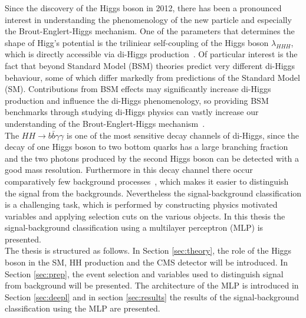 \label{sec:introduction}

Since the discovery of the Higgs boson in 2012, there has been a pronounced interest in understanding the
phenomenology of the new particle and especially the Brout-Englert-Higgs mechanism. One of the parameters
that determines the shape of Higg's potential is the triliniear self-coupling of the Higgs boson $\lambda_{HHH}$,
which is directly accessible via di-Higgs production~\cite{CMS:2021qbp, HandbookLHC}. Of particular interest is the fact that beyond Standard Model (BSM) theories
predict very different di-Higgs behaviour, some of which differ markedly from predictions of the Standard Model (SM).
Contributions from BSM effects may significantly increase di-Higgs production and influence the di-Higgs phenomenology, so providing BSM benchmarks
through studying di-Higgs physics can vastly increase our understanding of the Brout-Englert-Higgs mechanism~\cite{HandbookLHC}. \\

The $HH \rightarrow b \bar{b} \gamma \gamma$ is one of the most sensitive decay channels of di-Higgs, since the decay of one Higgs boson
to two bottom quarks has a large branching fraction and the two photons produced by the second Higgs boson can be detected with a good mass resolution.
Furthermore in this decay channel there occur comparatively few background processes~\cite{CMS:2021qbp}, which makes it easier to distinguish the signal from the backgrounds.
Nevertheless the signal-background classification
is a challenging task, which is performed by constructing physics motivated variables and applying selection cuts on the various objects.
In this thesis the signal-background classification using a multilayer perceptron (MLP) is presented. \\

The thesis is structured as follows. In Section \ref{sec:theory}, the role of the Higgs boson in the SM, HH production
and the CMS detector will be introduced. In Section \ref{sec:prep}, the event selection and variables used to distinguish signal from background will be presented.
The architecture of the MLP is introduced in Section \ref{sec:deepl} and in section \ref{sec:results} the results of the signal-background classification using the MLP are presented.